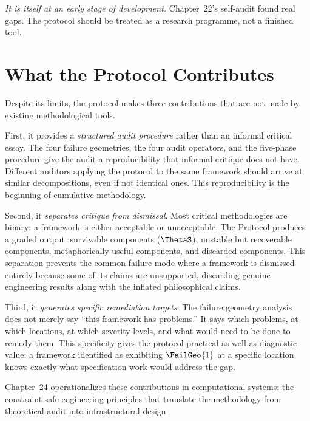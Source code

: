 \textit{It is itself at an early stage of development.}
Chapter~22's self-audit found real gaps. The protocol
should be treated as a research programme, not a finished
tool.

\section{What the Protocol Contributes}
\label{sec:protocol-contribution}

Despite its limits, the protocol makes three contributions
that are not made by existing methodological tools.

First, it provides a \emph{structured audit procedure}
rather than an informal critical essay. The four failure
geometries, the four audit operators, and the five-phase
procedure give the audit a reproducibility that informal
critique does not have. Different auditors applying
the protocol to the same framework should arrive at
similar decompositions, even if not identical ones.
This reproducibility is the beginning of cumulative
methodology.

Second, it \emph{separates critique from dismissal}.
Most critical methodologies are binary: a framework
is either acceptable or unacceptable. The \Ortyx{}
Protocol produces a graded output: survivable components
($\ThetaS$), unstable but recoverable components,
metaphorically useful components, and discarded
components. This separation prevents the common failure
mode where a framework is dismissed entirely because
some of its claims are unsupported, discarding genuine
engineering results along with the inflated philosophical
claims.

Third, it \emph{generates specific remediation targets}.
The failure geometry analysis does not merely say
``this framework has problems.'' It says which problems,
at which locations, at which severity levels, and what
would need to be done to remedy them. This specificity
gives the protocol practical as well as diagnostic value:
a framework identified as exhibiting $\FailGeo{1}$
at a specific location knows exactly what specification
work would address the gap.

\medskip

Chapter~24 operationalizes these contributions in
computational systems: the constraint-safe engineering
principles that translate the \Ortyx{} methodology
from theoretical audit into infrastructural design.
